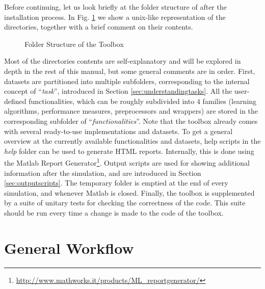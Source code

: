 Before continuing, let us look briefly at the folder structure of \toolboxname after the installation process. In Fig. \ref{fig:folders} we show a unix-like representation of the directories, together with a brief comment on their contents.

\begin{figure}[h]
\label{fig:folders}
\caption{Folder Structure of the Toolbox}
\end{figure} 

\noindent Most of the directories contents are self-explanatory and will be explored in depth in the rest of this manual, but some general comments are in order. First, datasets are partitioned into multiple subfolders, corresponding to the internal concept of ``\textit{task}'', introduced in Section \ref{sec:understandingtasks}. All the user-defined functionalities, which can be roughly subdivided into $4$ families (learning algorithms, performance measures, preprocessors and wrappers) are stored in the corresponding subfolder of ``\textit{functionalities}''. Note that the toolbox already comes with several ready-to-use implementations and datasets. To get a general overview at the currently available functionalities and datasets, help scripts in the \textit{help} folder can be used to generate HTML reports. Internally, this is done using the Matlab Report Generator\footnote{\url{http://www.mathworks.it/products/ML_reportgenerator/}}. Output scripts are used for showing additional information after the simulation, and are introduced in Section \ref{sec:outputscripts}. The temporary folder is emptied at the end of every simulation, and whenever Matlab is closed. Finally, the toolbox is supplemented by a suite of unitary tests for checking the correctness of the code. This suite should be run every time a change is made to the code of the toolbox.

\section{General Workflow}

